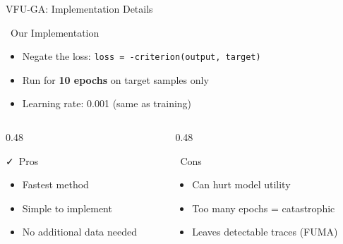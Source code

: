 \documentclass[aspectratio=169, 11pt]{beamer}
\begin{document}
\begin{frame}{VFU-GA: Implementation Details}
    \begin{block}{\faCode\ Our Implementation}
        \begin{itemize}
            \item Negate the loss: \texttt{loss = -criterion(output, target)}
            \item Run for \textbf{10 epochs} on target samples only
            \item Learning rate: 0.001 (same as training)
        \end{itemize}
    \end{block}
    
    \vspace{0.5em}
    \begin{columns}[T]
        \begin{column}{0.48\textwidth}
            \begin{exampleblock}{\faCheck\ Pros}
                \begin{itemize}
                    \item Fastest method
                    \item Simple to implement
                    \item No additional data needed
                \end{itemize}
            \end{exampleblock}
        \end{column}
        \begin{column}{0.48\textwidth}
            \begin{alertblock}{\faTimes\ Cons}
                \begin{itemize}
                    \item Can hurt model utility
                    \item Too many epochs = catastrophic
                    \item Leaves detectable traces (FUMA)
                \end{itemize}
            \end{alertblock}
        \end{column}
    \end{columns}
\end{frame}
\end{document}
